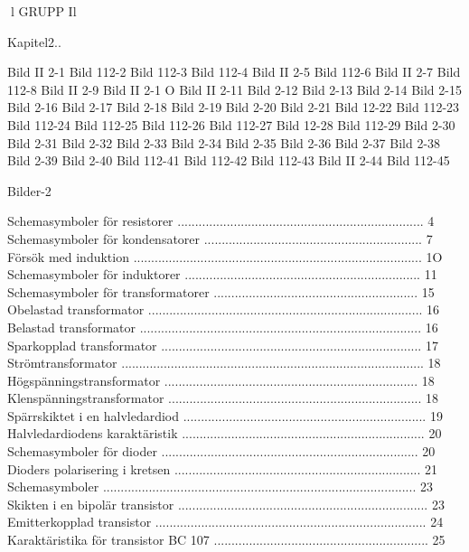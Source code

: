 l
GRUPP Il

Kapitel2..

Bild II 2-1
Bild 112-2
Bild 112-3
Bild 112-4
Bild II 2-5
Bild 112-6
Bild II 2-7
Bild 112-8
Bild II 2-9
Bild II 2-1 O
Bild II 2-11
Bild 2-12
Bild 2-13
Bild 2-14
Bild 2-15
Bild 2-16
Bild 2-17
Bild 2-18
Bild 2-19
Bild 2-20
Bild 2-21
Bild 12-22
Bild 112-23
Bild 112-24
Bild 112-25
Bild 112-26
Bild 112-27
Bild 12-28
Bild 112-29
Bild 2-30
Bild 2-31
Bild 2-32
Bild 2-33
Bild 2-34
Bild 2-35
Bild 2-36
Bild 2-37
Bild 2-38
Bild 2-39
Bild 2-40
Bild 112-41
Bild 112-42
Bild 112-43
Bild II 2-44
Bild 112-45

Bilder-2

Schemasymboler för resistorer ...................................................................... 4
Schemasymboler för kondensatorer .............................................................. 7
Försök med induktion .................................................................................. 1O
Schemasymboler för induktorer ................................................................... 11
Schemasymboler för transformatorer .......................................................... 15
Obelastad transformator .............................................................................. 16
Belastad transformator ................................................................................ 16
Sparkopplad transformator .......................................................................... 17
Strömtransformator ...................................................................................... 18
Högspänningstransformator ........................................................................ 18
Klenspänningstransformator ........................................................................ 18
Spärrskiktet i en halvledardiod ..................................................................... 19
Halvledardiodens karaktäristik ..................................................................... 20
Schemasymboler för dioder ......................................................................... 20
Dioders polarisering i kretsen ...................................................................... 21
Schemasymboler ......................................................................................... 23
Skikten i en bipolär transistor ....................................................................... 23
Emitterkopplad transistor ............................................................................. 24
Karaktäristika för transistor BC 107 ............................................................. 25
